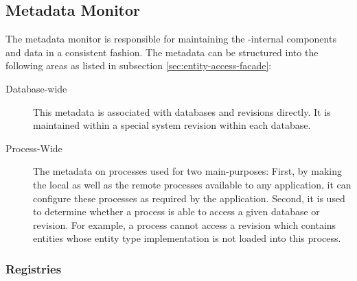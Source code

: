 \documentclass[a4paper, 10pt]{book}
\begin{document}
                                \subsection{Metadata Monitor}
                                \label{sec:metadata-monitor}

                                The metadata monitor is responsible for maintaining the \SYNEIGHT-internal
                                components and data in a consistent fashion. The metadata can be
                                structured into the following areas as listed in subsection
                                \vref{sec:entity-access-facade}:
                                \begin{description}
                                    \item[Database-wide] This metadata is associated with databases and
                                        revisions directly. It is maintained within a special system
                                        revision within each database.
                                    \item[Process-Wide] The metadata on processes used for two
                                        main-purposes: First, by making the local as well as the remote
                                        processes available to any application, it can configure these
                                        processes as required by the application. Second, it is used to
                                        determine whether a process is able to access a given database or
                                        revision. For example, a process cannot access a revision which
                                        contains entities whose entity type implementation is not loaded
                                        into this process.
                                \end{description}

                                \subsubsection{Registries}
\end{document}
